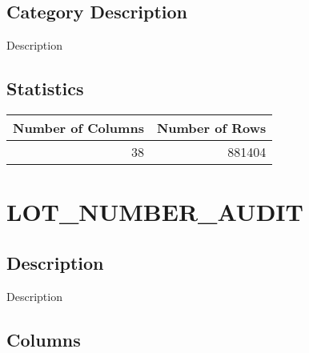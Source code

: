 \documentclass[
  letterpaper,
  DIV=11,
  numbers=noendperiod]{scrreprt}
\begin{document}
\hypertarget{category-description-19}{%
\section*{Category Description}\label{category-description-19}}

Description

\hypertarget{statistics-19}{%
\section*{Statistics}\label{statistics-19}}

\begin{longtable}{rr}
\toprule
Number of Columns & Number of Rows \\ 
\midrule
38 & 881404 \\ 
\bottomrule
\end{longtable}

\hypertarget{lot_number_audit}{%
\chapter*{LOT\_NUMBER\_AUDIT}\label{lot_number_audit}}

\hypertarget{description-20}{%
\section*{Description}\label{description-20}}

Description

\hypertarget{columns-20}{%
\section*{Columns}\label{columns-20}}
\end{document}
